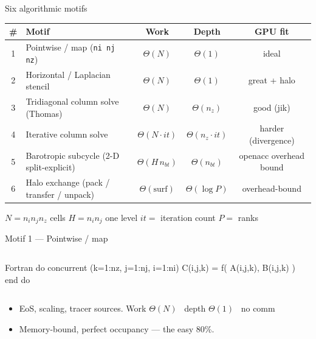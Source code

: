 \documentclass[aspectratio=169]{beamer}
\newcommand{\cplx}[1]{{\footnotesize\color{cookieMuted}#1}}
\begin{document}
\begin{frame}{Six algorithmic motifs}
  \centering
  \small
  \begin{tabularx}{\textwidth}{@{}clccc@{}}
    \toprule
    \# & Motif & Work & Depth & GPU fit \\
    \midrule
    1 & Pointwise / map (\texttt{ni\,nj\,nz})        & $\Theta(N)$        & $\Theta(1)$           & ideal \\
    2 & Horizontal / Laplacian stencil               & $\Theta(N)$        & $\Theta(1)$           & great + halo \\
    3 & Tridiagonal column solve (Thomas)            & $\Theta(N)$        & $\Theta(n_z)$         & good (jik) \\
    4 & Iterative column solve                       & $\Theta(N\cdot it)$& $\Theta(n_z\cdot it)$ & harder (divergence) \\
    5 & Barotropic subcycle (2-D split-explicit)     & $\Theta(H\,n_{bt})$& $\Theta(n_{bt})$      & openacc overhead bound \\
    6 & Halo exchange (pack / transfer / unpack)     & $\Theta(\text{surf})$ & $\Theta(\log P)$   & overhead-bound \\
    \bottomrule
  \end{tabularx}
  \vspace{.7em}

  \footnotesize $N=n_i n_j n_z$ cells \quad $H=n_i n_j$ one level \quad $it=$ iteration count \quad $P=$ ranks
\end{frame}

\begin{frame}[fragile]{Motif 1 --- Pointwise / map}
  \begin{columns}[c,onlytextwidth]
      \centering
      \begin{cookiecode}[title=embarrassingly parallel]{Fortran}
do concurrent (k=1:nz, j=1:nj, i=1:ni)
  C(i,j,k) = f( A(i,j,k), B(i,j,k) )
end do
      \end{cookiecode}
  \end{columns}
  \vspace{.3em}
  \begin{itemize}
    \item EoS, scaling, tracer sources. \cplx{Work $\Theta(N)$ \textperiodcentered\ depth $\Theta(1)$ \textperiodcentered\ no comm}
    \item Memory-bound, perfect occupancy --- the easy 80\%.
  \end{itemize}
\end{frame}
\end{document}
